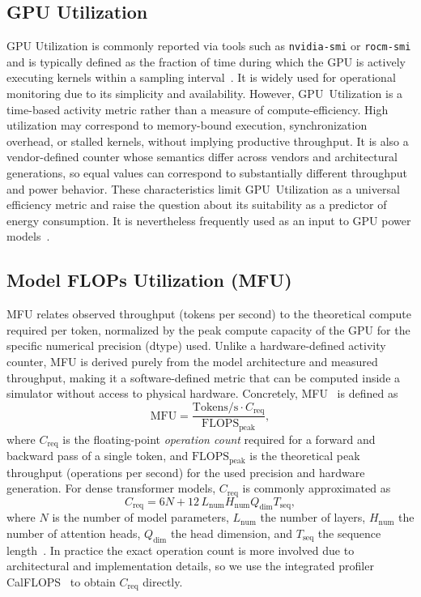 \documentclass[10pt,conference,letterpaper]{IEEEtran}
\begin{document}
\subsection{GPU Utilization}\label{sec:bg-gpu-util}
GPU Utilization is commonly reported via tools such as \texttt{nvidia-smi} or \texttt{rocm-smi} and is typically defined as the fraction of time during which the GPU is actively executing kernels within a sampling interval~\cite{cornelius-2025, nvidia-no-dateA}.
It is widely used for operational monitoring due to its simplicity and availability.
However, GPU~Utilization is a time-based activity metric rather than a measure of compute-efficiency.
High utilization may correspond to memory-bound execution, synchronization overhead, or stalled kernels, without implying productive throughput.
It is also a vendor-defined counter whose semantics differ across vendors and architectural generations, so equal values can correspond to substantially different throughput and power behavior.
These characteristics limit GPU~Utilization as a universal efficiency metric and raise the question about its suitability as a predictor of energy consumption.
It is nevertheless frequently used as an input to GPU power models~\cite{antarctica-2025, bridges-2016}.

\subsection{Model FLOPs Utilization (MFU)}\label{sec:bg-mfu}
MFU relates observed throughput (tokens per second) to the theoretical compute required per token, normalized by the peak compute capacity of the GPU for the specific numerical precision (dtype) used.
Unlike a hardware-defined activity counter, MFU is derived purely from the model architecture and measured throughput, making it a software-defined metric that can be computed inside a simulator without access to physical hardware.
Concretely, MFU~\cite{chowdhery-2023,ray-2025} is defined as
\begin{equation*}
    \text{MFU} = \frac{\text{Tokens/s} \cdot C_{\text{req}}}{\text{FLOPS}_{\text{peak}}},
\end{equation*}
where $C_{\text{req}}$ is the floating-point \emph{operation count} required for a forward and backward pass of a single token, and $\text{FLOPS}_{\text{peak}}$ is the theoretical peak throughput (operations per second) for the used precision and hardware generation.
For dense transformer models, $C_{\text{req}}$ is commonly approximated as
\begin{equation*}
    C_{\text{req}} = 6N + 12\,L_{\text{num}} H_{\text{num}} Q_{\text{dim}} T_{\text{seq}},
\end{equation*}
where $N$ is the number of model parameters, $L_{\text{num}}$ the number of layers, $H_{\text{num}}$ the number of attention heads, $Q_{\text{dim}}$ the head dimension, and $T_{\text{seq}}$ the sequence length~\cite{chowdhery-2023}.
In practice the exact operation count is more involved due to architectural and implementation details, so we use the integrated profiler CalFLOPS~\cite{calflops} to obtain $C_{\text{req}}$ directly.
\end{document}
